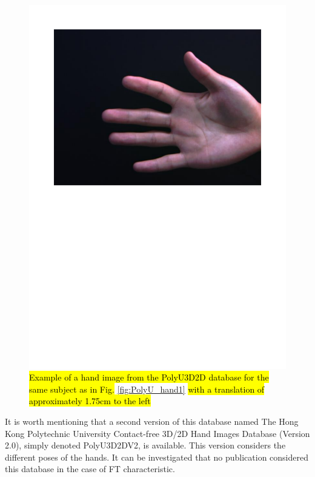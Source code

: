 \documentclass[review]{elsarticle}
\begin{document}
		\begin{figure}[!h]
		    \centering
		    \includegraphics[page=4,scale=.57,trim=1cm 14.7cm 1cm 1.5cm,clip]{PolyU3D2D_samples.pdf}
		    \caption{\hl{Example of a hand image from the PolyU3D2D database for the same subject as in Fig.} \ref{fig:PolyU_hand1} \hl{with a translation of approximately 1.75cm to the left}}
		    \label{fig:PolyU_hand4}
		\end{figure}

	It is worth mentioning that a second version of this database named The Hong Kong Polytechnic University Contact-free 3D/2D Hand Images Database (Version 2.0), simply denoted PolyU3D2DV2, is available. This version considers the different poses of the hands. It can be investigated that no publication considered this database in the case of FT characteristic.
	
\end{document}
